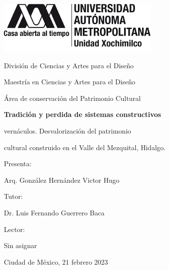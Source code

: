 \begin{titlepage}

	{\includegraphics[width=0.6\textwidth]{../imagenes/logo_uam/logo_completo.png}\par}
	\vspace{0.5cm}
	{\large División de Ciencias y Artes para el Diseño\par}
	{\small Maestría en Ciencias y Artes para el Diseño\par}
	{\small Área de conservación del Patrimonio Cultural\par}
	\vspace{1.5cm}
	{\bfseries \Large Tradición y perdida de sistemas constructivos\par vernáculos. Desvalorización del patrimonio\par cultural construido en el Valle del Mezquital, Hidalgo.\par}
	\vspace{1.5cm}
	{\small Presenta:\par}
	{Arq. González Hernández Victor Hugo\par}
	{\small Tutor:\par}
	{Dr. Luis Fernando Guerrero Baca\par}
	{\small Lector:\par}
	{Sin asignar\par}
	\vspace{1cm}
	{\small Ciudad de México, 21 febrero 2023\par}

\end{titlepage}
